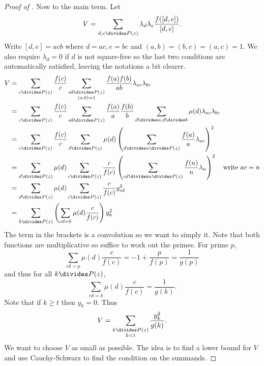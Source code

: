 \documentclass[a4paper]{article}
\theoremstyle{definition}
\begin{document}
\begin{proof}[Proof of ]
  Now to the main term. Let
  \[
    V = \sum_{d, e \divides P(z)} \lambda_d \lambda_e \frac{f([d, e])}{[d, e]}.
  \]
  Write \([d, e] = acb\) where \(d = ac, e = bc\) and \((a, b) = (b, c) = (a, c) = 1\). We also require \(\lambda_d = 0\) if \(d\) is not square-free so the last two conditions are automatically satisfied, leaving the notations a bit clearer.
  \begin{align*}
    V
    &= \sum_{c \divides P(z)} \frac{f(c)}{c} \sum_{\substack{ab \divides P(z) \\ (a, b) = 1}} \frac{f(a)f(b)}{ab} \lambda_{ac} \lambda_{bc} \\
    &= \sum_{c \divides P(z)} \frac{f(c)}{c} \sum_{ab \divides P(z)} \frac{f(a)}{a} \frac{f(b)}{b} \sum_{d \divides a, d \divides b} \mu(d) \lambda_{ac} \lambda_{bc} \\
    &= \sum_{c \divides P(z)} \frac{f(c)}{c} \sum_{d \divides P(z)} \mu(d) \left( \sum_{d \divides a \divides P(z)} \frac{f(a)}{a} \lambda_{ac} \right)^2 \\
    &= \sum_{d \divides P(z)} \mu(d) \sum_{c \divides P(z)} \frac{c}{f(c)} \left( \sum_{cd \divides n \divides P(z)} \frac{f(n)}{n} \lambda_n \right)^2 \quad \text{write \(ac = n\)} \\
    &= \sum_{d \divides P(z)} \mu(d) \sum_{c \divides P(z)} \frac{c}{f(c)} y^2_{cd} \\
    &= \sum_{k \divides P(z)} \left( \sum_{cd = k} \mu(d) \frac{c}{f(c)} \right) y_k^2
  \end{align*}
  The term in the brackets is a convolution so we want to simply it. Note that both functions are multiplicative so suffice to work out the primes. For prime \(p\),
  \[
    \sum_{cd = p} \mu(d) \frac{c}{f(c)}
    = -1 + \frac{p}{f(p)} = \frac{1}{g(p)}
  \]
  and thus for all \(k \divides P(z)\),
  \[
    \sum_{cd = k} \mu(d) \frac{c}{f(c)} = \frac{1}{g(k)}.
  \]
  Note that if \(k \geq t\) then \(y_k = 0\). Thus
  \[
    V = \sum_{\substack{k \divides P(z) \\ k < t}} \frac{y_k^2}{g(k)}.
  \]
  We want to choose \(V\) as small as possible. The idea is to find a lower bound for \(V\) and use Cauchy-Schwarz to find the condition on the summands.


\end{proof}
\end{document}
